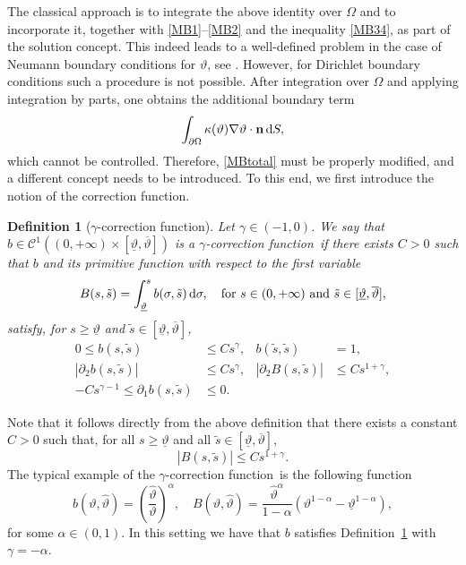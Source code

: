 \documentclass[11pt, a4paper, reqno]{amsart}
\newtheorem{definition}[theorem]{Definition}
\newtheorem{example}[theorem]{Example}
\numberwithin{equation}{section}
\newcommand{\thetah}{\hat\thet}
\newcommand{\vc}[1]{{\bf #1}}
\newcommand{\vn}{\vc{n}}
\newcommand{\thet}{\vartheta}
\newcommand{\tmin}{\underline{\thet}}
\newcommand{\tmax}{\overline{\thet}}
\newcommand{\bb}{b}
\newcommand{\B}{B}
\newcommand{\blafnc}{correction function}
\begin{document}
The classical approach is to integrate the above identity over $\Omega$ and to incorporate it, together with \eqref{MB1}--\eqref{MB2} and the inequality \eqref{MB34}, as part of the solution concept. This indeed leads to a well-defined problem in the case of Neumann boundary conditions for $\thet$, see \cite{Fe04,BuFeMa2009,BuMaRa09}. 
However, for Dirichlet boundary conditions such a procedure is not possible. After integration over $\Omega$ and applying integration by parts, one obtains the additional boundary term
\[
  \int_{\partial \Omega} \kappa(\thet)\nabla \thet \cdot \vn \, \mathrm{d}S,
\]
which cannot be controlled. Therefore, \eqref{MBtotal} must be properly modified, and a different concept needs to be introduced. To this end, we first introduce the notion of the \blafnc.
\begin{definition}[$\gamma$-\blafnc]\label{def:blafnc}
Let $\gamma \in (-1,0)$. We say that 
$\bb \in \mathcal{C}^1((0,+\infty) \times [\tmin,\tmax])$ 
is a $\gamma$-\blafnc\ if there exists $C>0$ such that $\bb$ and its primitive function with respect to the first variable
\begin{equation}\label{Bdef}
\B(s, \tilde{s}) = \int_{\tmin}^s \bb(\sigma, \tilde{s}) \, {\rm d} \sigma, 
\quad \text{for } s \in (0,+\infty) \text{ and } \tilde{s} \in [\tmin,\tmax],
\end{equation}
satisfy, for $s \geq \tmin$ and $\tilde{s} \in [\tmin,\tmax]$,
\begin{align}
\label{item0}  
0 \leq b(s,\tilde s) &\leq C s^\gamma, & b(\tilde{s},\tilde{s}) &= 1, \\
\label{item2} 
|\partial_2 b(s, \tilde{s})| &\leq C s^\gamma, & |\partial_2 B(s, \tilde{s})| &\leq C s^{1+\gamma},\\
\label{item3}
- C s^{\gamma-1} \leq \partial_1 b(s, \tilde{s}) &\leq 0.
\end{align}
\end{definition}
Note that it follows directly from the above definition that there exists a constant $C>0$ such that, for all $s \geq \tmin$ and all $\tilde{s} \in [\tmin,\tmax]$, 
\begin{equation}\label{rem:B-growth}
  |B(s,\tilde s)| \leq C s^{1+\gamma}.
\end{equation}
The typical example of the $\gamma$-\blafnc\ is the following function
\begin{equation}\label{bEX}
  \bb(\thet,\thetah)=\left(\frac \thetah\thet\right)^\alpha,\quad B(\thet,\thetah)=\frac{\thetah^\alpha}{1-\alpha}\left(\thet^{1-\alpha}-\tmin^{1-\alpha}\right),
\end{equation}
for some $\alpha\in(0,1)$. In this setting we have that $\bb$ satisfies Definition~\ref{def:blafnc} with $\gamma=-\alpha$.
\end{document}

